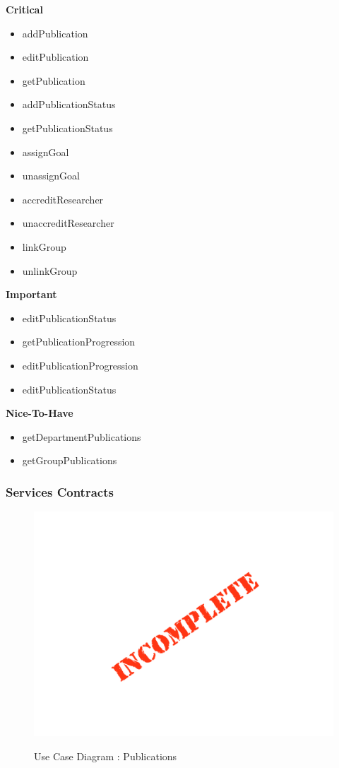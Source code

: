 \documentclass{article}
\begin{document}
		\begin{flushleft}
		\textbf{Critical}
			\begin{itemize}
					\item addPublication
					\item editPublication
					\item getPublication
					\item addPublicationStatus
					\item getPublicationStatus
					\item assignGoal
					\item unassignGoal
					\item accreditResearcher
					\item unaccreditResearcher
					\item linkGroup
					\item unlinkGroup
			\end{itemize}

		\textbf{Important}
			\begin{itemize}
					\item editPublicationStatus
					\item getPublicationProgression
					\item editPublicationProgression
					\item editPublicationStatus
			\end{itemize}

		\textbf{Nice-To-Have}
			\begin{itemize}
					\item getDepartmentPublications
					\item getGroupPublications
			\end{itemize}
	\end{flushleft}

	\subsubsection{Services Contracts}

	\begin{figure}[H]
	\includegraphics[width=\textwidth]{images/Incomplete.png}  \\
	\caption{Use Case Diagram : Publications}
	\end{figure}
\end{document}
